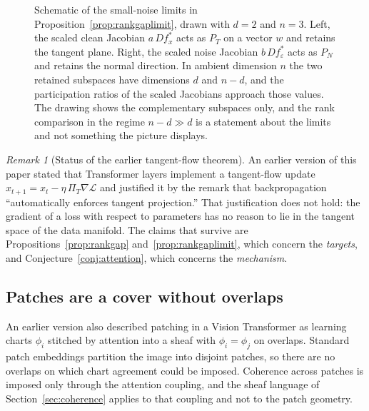 \documentclass[11pt,a4paper]{article}
\theoremstyle{definition}
\theoremstyle{remark}
\newtheorem{remark}[theorem]{Remark}
\begin{document}
\begin{figure}[ht]
\begin{minipage}[c]{0.49\linewidth}
\end{minipage}
\caption{Schematic of the small-noise limits in
Proposition~\ref{prop:rankgaplimit}, drawn with $d=2$ and $n=3$. Left, the
scaled clean Jacobian $a\,Df_x^\ast$ acts as $P_T$ on a vector $w$ and retains
the tangent plane. Right, the scaled noise Jacobian $b\,Df_\varepsilon^\ast$
acts as $P_N$ and retains the normal direction. In ambient dimension $n$ the
two retained subspaces have dimensions $d$ and $n-d$, and the participation
ratios of the scaled Jacobians approach those values. The drawing shows the
complementary subspaces only, and the rank comparison in the regime
$n-d\gg d$ is a statement about the limits and not something the picture
displays.}
\label{fig:projectors}
\end{figure}

\begin{remark}[Status of the earlier tangent-flow theorem]
An earlier version of this paper stated that Transformer layers implement
a tangent-flow update $x_{t+1}=x_t-\eta\,\Pi_{T}\nabla\mathcal{L}$ and
justified it by the remark that backpropagation ``automatically enforces
tangent projection.'' That justification does not hold: the gradient of a
loss with respect to parameters has no reason to lie in the tangent space of
the data manifold. The claims that survive are Propositions~\ref{prop:rankgap}
and~\ref{prop:rankgaplimit}, which concern the \emph{targets}, and
Conjecture~\ref{conj:attention}, which concerns the \emph{mechanism}.
\end{remark}

\subsection{Patches are a cover without overlaps}

An earlier version also described patching in a Vision Transformer as
learning charts $\phi_i$ stitched by attention into a sheaf with
$\phi_i=\phi_j$ on overlaps. Standard patch embeddings partition the image
into disjoint patches, so there are no overlaps on which chart agreement
could be imposed. Coherence across patches is imposed only through the
attention coupling, and the sheaf language of Section~\ref{sec:coherence}
applies to that coupling and not to the patch geometry.
\end{document}

